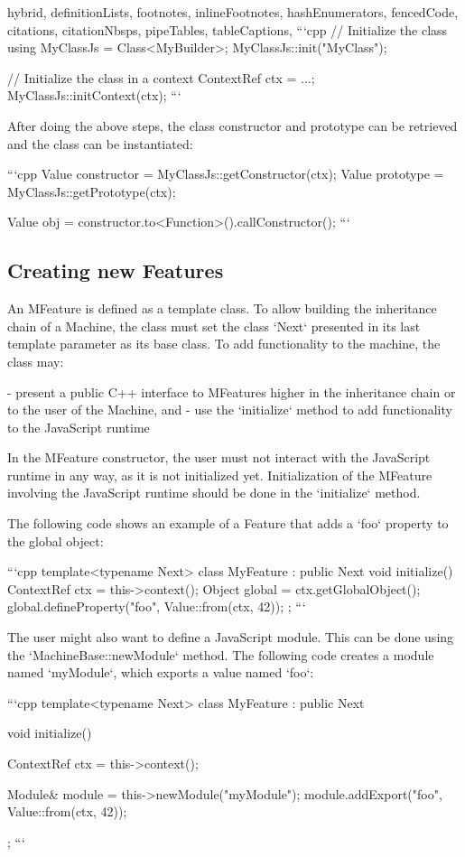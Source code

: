 \begin{markdown*}{%
  hybrid,
  definitionLists,
  footnotes,
  inlineFootnotes,
  hashEnumerators,
  fencedCode,
  citations,
  citationNbsps,
  pipeTables,
  tableCaptions,
}
```cpp
// Initialize the class
using MyClassJs = Class<MyBuilder>;
MyClassJs::init("MyClass");

// Initialize the class in a context
ContextRef ctx = ...;
MyClassJs::initContext(ctx);
```

After doing the above steps, the class constructor and prototype can be retrieved and the class can be instantiated:

```cpp
Value constructor = MyClassJs::getConstructor(ctx);
Value prototype = MyClassJs::getPrototype(ctx);

Value obj = constructor.to<Function>().callConstructor();
```

\subsection{Creating new Features}

An MFeature is defined as a template class. To allow building the inheritance chain of a Machine, the class must set the class `Next` presented in its last template parameter as its base class. To add functionality to the machine, the class may:

  - present a public C++ interface to MFeatures higher in the inheritance chain or to the user of the Machine, and
  - use the `initialize` method to add functionality to the JavaScript runtime

In the MFeature constructor, the user must not interact with the JavaScript runtime in any way, as it is not initialized yet. Initialization of the MFeature involving the JavaScript runtime should be done in the `initialize` method.

The following code shows an example of a Feature that adds a `foo` property to the global object:

```cpp
template<typename Next>
class MyFeature : public Next {
  void initialize() {
    ContextRef ctx = this->context();
    Object global = ctx.getGlobalObject();
    global.defineProperty("foo", Value::from(ctx, 42));
  }
};
```

The user might also want to define a JavaScript module. This can be done using the `MachineBase::newModule` method. The following code creates a module named `myModule`, which exports a value named `foo`:

```cpp
template<typename Next>
class MyFeature : public Next {
  void initialize() {
    ContextRef ctx = this->context();

    Module& module = this->newModule("myModule");
    module.addExport("foo", Value::from(ctx, 42));
  }
};
```


\end{markdown*}
